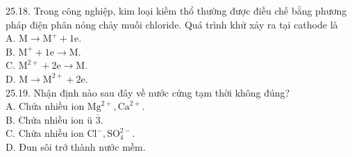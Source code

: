 \documentclass[10pt]{article}
\begin{document}
25.18. Trong công nghiệp, kim loại kiềm thổ thường được điều chế bằng phương pháp điện phân nóng chảy muối chloride. Quá trình khử xảy ra tại cathode là\\
A. $\mathrm{M} \rightarrow \mathrm{M}^{+}+1 \mathrm{e}$.\\
B. $\mathrm{M}^{+}+1 \mathrm{e} \rightarrow \mathrm{M}$.\\
C. $\mathrm{M}^{2+}+2 \mathrm{e} \rightarrow \mathrm{M}$.\\
D. $\mathrm{M} \rightarrow \mathrm{M}^{2+}+2 \mathrm{e}$.\\
25.19. Nhận định nào sau đây về nước cứng tạm thời không đúng?\\
A. Chứa nhiều ion $\mathrm{Mg}^{2+}, \mathrm{Ca}^{2+}$.\\
B. Chứa nhiều ion ü $\overline{3}$.\\
C. Chứa nhiều ion $\mathrm{Cl}^{-}, \mathrm{SO}_{4}^{2-}$.\\
D. Đun sôi trở thành nước mềm.
\end{document}
